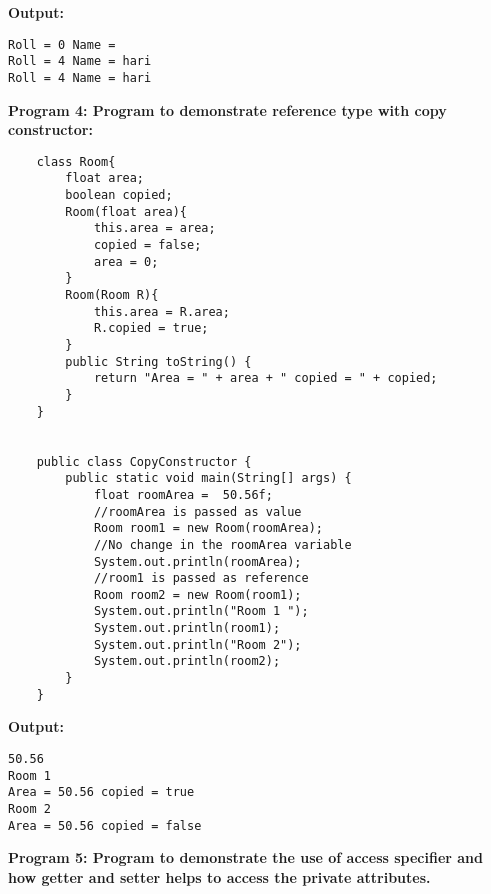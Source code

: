 \documentclass{book}
\begin{document}
\par
\textbf{Output:}
\begin{verbatim}
Roll = 0 Name =
Roll = 4 Name = hari
Roll = 4 Name = hari 
\end{verbatim}
\par
\textbf{Program 4: Program to demonstrate reference type with copy constructor:}
\begin{verbatim}
    class Room{
        float area;
        boolean copied;
        Room(float area){
            this.area = area;
            copied = false;
            area = 0;
        }
        Room(Room R){
            this.area = R.area;
            R.copied = true;
        }
        public String toString() {
            return "Area = " + area + " copied = " + copied;
        }
    }


    public class CopyConstructor {
        public static void main(String[] args) {
            float roomArea =  50.56f;
            //roomArea is passed as value
            Room room1 = new Room(roomArea);
            //No change in the roomArea variable
            System.out.println(roomArea);
            //room1 is passed as reference
            Room room2 = new Room(room1);
            System.out.println("Room 1 ");
            System.out.println(room1);
            System.out.println("Room 2");
            System.out.println(room2);
        }
    }
\end{verbatim}
\par
\textbf{Output:}
\begin{verbatim}
50.56
Room 1 
Area = 50.56 copied = true
Room 2
Area = 50.56 copied = false
\end{verbatim}
\par
\textbf{Program 5: Program to demonstrate the use of access specifier and how getter and setter helps to access the private attributes.}
\end{document}
